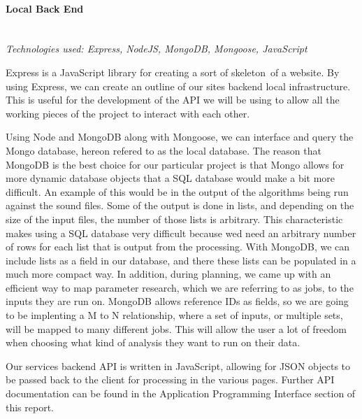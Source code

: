 \paragraph{Local Back End} \mbox{}\\
\textit{Technologies used: Express, NodeJS, MongoDB, Mongoose, JavaScript}\par
Express is a JavaScript library for creating a sort of \textquotesingle skeleton\textquotesingle\ of a website. By using Express, we can create an outline of our site\textquotesingle s backend local infrastructure. This is useful for the development of the API we will be using to allow all the working pieces of the project to interact with each other.\par
Using Node and MongoDB along with Mongoose, we can interface and query the Mongo database, hereon refered to as the local database. The reason that MongoDB is the best choice for our particular project is that Mongo allows for more dynamic database objects that a SQL database would make a bit more difficult. An example of this would be in the output of the algorithms being run against the sound files. Some of the output is done in lists, and depending on the size of the input files, the number of those lists is arbitrary. This characteristic makes using a SQL database very difficult because we\textquotesingle d need an arbitrary number of rows for each list that is output from the processing. With MongoDB, we can include lists as a field in our database, and there these lists can be populated in a much more compact way. In addition, during planning, we came up with an efficient way to map parameter research, which we are referring to as jobs, to the inputs they are run on. MongoDB allows reference IDs as fields, so we are going to be implenting a M to N relationship, where a set of inputs, or multiple sets, will be mapped to many different jobs. This will allow the user a lot of freedom when choosing what kind of analysis they want to run on their data.\par
Our service\textquotesingle s backend API is written in JavaScript, allowing for JSON objects to be passed back to the client for processing in the various pages. Further API documentation can be found in the Application Programming Interface section of this report.

